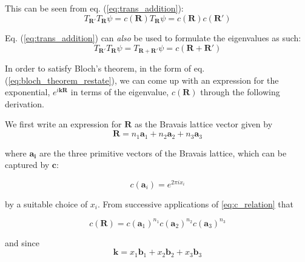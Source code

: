 This can be seen from eq. (\ref{eq:trans_addition}):
\begin{equation} \label{eq:derive_crelation1}
T_{\boldsymbol{R}'} T_{\boldsymbol{R}} \psi
= c(\boldsymbol{R}) T_{\boldsymbol{R}} \psi
= c(\boldsymbol{R}) c(\boldsymbol{R}')
\end{equation}

Eq. (\ref{eq:trans_addition}) can \emph{also} be used to formulate the eigenvalues as such:
\begin{equation}
T_{\boldsymbol{R}'} T_{\boldsymbol{R}} \psi
= T_{\boldsymbol{R} + \boldsymbol{R'}} \psi
= c(\boldsymbol{R} + \boldsymbol{R'}) 
\end{equation}

In order to satisfy Bloch's theorem, in the form of eq. (\ref{eq:bloch_theorem_restate}), we can come up with an expression for the exponential, $e^{i\boldsymbol{k} \boldsymbol{R}}$ in terms of the eigenvalue, $c(\boldsymbol{R})$ through the following derivation.

We first write an expression for $\boldsymbol{R}$ as the Bravais lattice vector given by
\begin{equation} \label{eq:r_express}
\boldsymbol{R} = n_{1} \boldsymbol{a}_{1}
+ n_{2} \boldsymbol{a}_{2}
+ n_{3} \boldsymbol{a}_{3}
\end{equation}

where $\boldsymbol{a_{i}}$ are the three primitive vectors of the Bravais lattice, which can be captured by $\boldsymbol{c}$: 

\begin{equation} \label{eq:c_exp}
c(\boldsymbol{a}_{i}) = e^{2 \pi i x_{i}}
\end{equation}

by a suitable choice  of $x_i$. From successive applications of \ref{eq:c_relation} that

\begin{equation} \label{eq:c_mult}
c(\boldsymbol{R})
= c(\boldsymbol{a}_1)^{n_1}
c(\boldsymbol{a}_2)^{n_2}
c(\boldsymbol{a}_3)^{n_3}
\end{equation}

and since
\begin{equation} \label{eq:k_with_bi}
\boldsymbol{k} = x_1 \boldsymbol{b}_1
+ x_2\boldsymbol{b}_2
+ x_3 \boldsymbol{b}_3
\end{equation}

